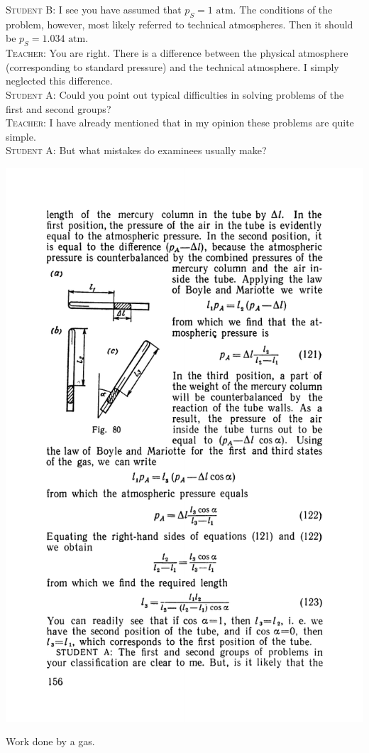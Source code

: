 \documentclass[a4paper,sfsidenotes]{tufte-book}
\begin{document}
\textsc{Student B:} I see you have assumed that $p_{S} = 1 \,\,\text{atm}$. The conditions of the problem, however, most likely referred to technical atmospheres. Then it should be  $p_{S} = 1.034 \,\,\text{atm}$. 
\\
\textsc{Teacher:} You are right. There is a difference between the physical atmosphere (corresponding to standard pressure) and the technical atmosphere. I simply neglected this difference.
\\
\textsc{Student A:} Could you point out typical difficulties in solving problems of the first and second groups?
\\
\textsc{Teacher:} I have already mentioned that in my opinion these problems are quite simple.
\\
\textsc{Student A:} But what mistakes do examinees usually make?
\begin{marginfigure}%
\centering
\includegraphics[width=\linewidth]{fig-080a}
\caption{Work done by a gas.}
\label{fig-80}
\end{marginfigure}
\end{document}
